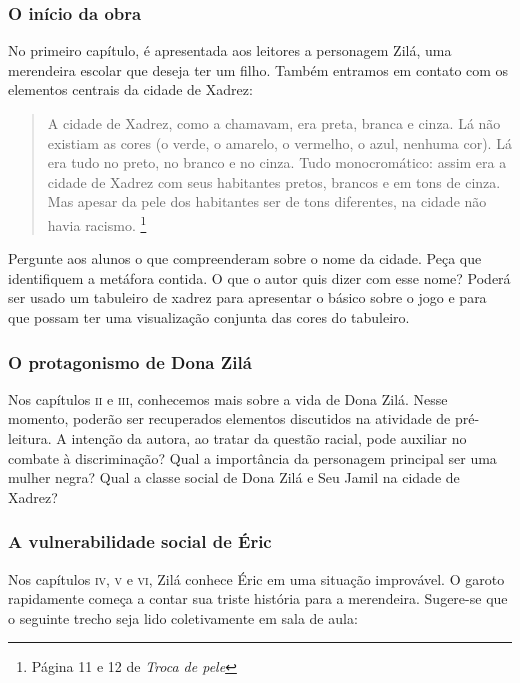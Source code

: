 \documentclass[11pt]{extarticle}
\begin{document}
\subsubsection{O início da obra}

No primeiro capítulo, é apresentada aos leitores a personagem Zilá, uma merendeira escolar que deseja ter um filho. Também entramos em contato com os elementos centrais da cidade de Xadrez:

\begin{quote}A cidade de Xadrez, como a chamavam, era preta, branca e cinza. Lá não existiam as cores (o verde, o amarelo, o vermelho, o azul, nenhuma cor). Lá era tudo no preto, no branco e no cinza. Tudo monocromático: assim era a cidade de Xadrez com seus habitantes pretos, brancos e em tons de cinza. Mas apesar da pele dos habitantes ser de tons diferentes, na cidade não havia racismo. \footnote{Página 11 e 12 de \textit{Troca de pele}}\end{quote}

Pergunte aos alunos o que compreenderam sobre o nome da cidade. Peça que identifiquem a metáfora contida. O que o autor quis dizer com esse nome? Poderá ser usado um tabuleiro de xadrez para apresentar o básico sobre o jogo e para que possam ter uma visualização conjunta das cores do tabuleiro. 

\subsubsection{O protagonismo de Dona Zilá}

Nos capítulos \textsc{ii} e \textsc{iii}, conhecemos mais sobre a vida de Dona Zilá. Nesse momento, poderão ser recuperados elementos discutidos na atividade de pré-leitura. A intenção da autora, ao tratar da questão racial, pode auxiliar no combate à discriminação? Qual a importância da personagem principal ser uma mulher negra? Qual a classe social de Dona Zilá e Seu Jamil na cidade de Xadrez?


\subsubsection{A vulnerabilidade social de Éric}

Nos capítulos \textsc{iv}, \textsc{v} e \textsc{vi}, Zilá conhece Éric em uma situação improvável. O garoto rapidamente começa a contar sua triste história para a merendeira. Sugere-se que o seguinte trecho seja lido coletivamente em sala de aula:
\end{document}
